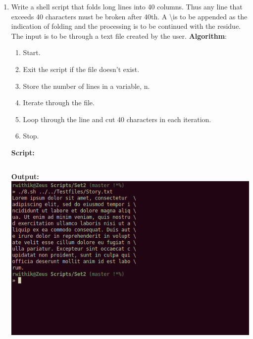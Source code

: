 \documentclass[10pt,a4paper,titlepage]{report}
\begin{document}
\begin{enumerate}
\item Write a shell script that folds long lines into 40 columns. Thus any line that exceeds 40 characters must be broken after 40th. A \textbackslash  is to be appended as the indication of folding and the processing is to be continued with the residue. The input is to be through a text file created by the user. \newline
\textbf{Algorithm}:\newline
\begin{enumerate}
	\item Start.
	\item Exit the script if the file doesn't exist.
	\item Store the number of lines in a variable, n.
	\item Iterate through the file.
	\item Loop through the line and cut 40 characters in each iteration.
	\item Stop.
\end{enumerate}
\newline
\textbf{Script:}\newline
\inputminted{bash}{../Scripts/Set2/8.sh}
\newline
\textbf{Output:}\newline
\includegraphics[width=\linewidth]{../Images/Shell2/8.png}
\pagebreak


\end{enumerate}
\end{document}
